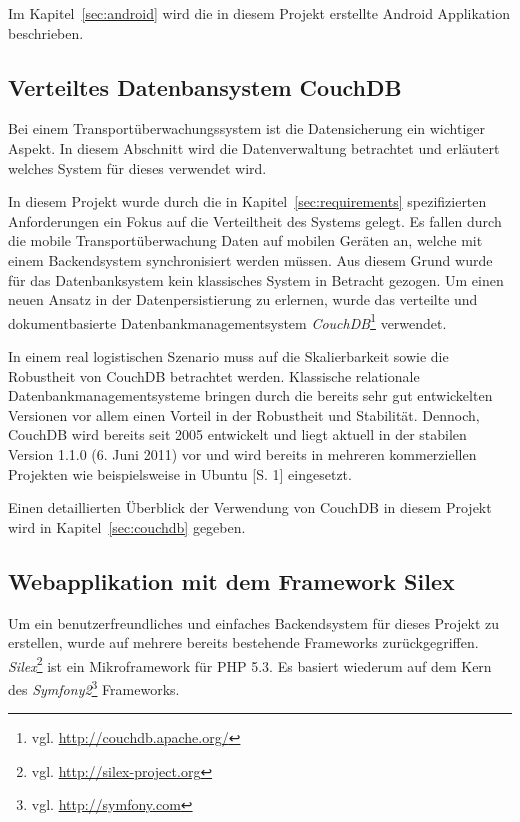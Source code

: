 Im Kapitel~\ref{sec:android} wird die in diesem Projekt erstellte Android Applikation
	beschrieben.

\subsection{Verteiltes Datenbansystem CouchDB}
\label{subsec:couchdb}

Bei einem Transportüberwachungssystem ist die Datensicherung ein
	wichtiger Aspekt. In diesem Abschnitt wird die Datenverwaltung
	betrachtet und erläutert welches System für dieses
	verwendet wird.

In diesem Projekt wurde durch die in Kapitel~\ref{sec:requirements} spezifizierten
	Anforderungen ein Fokus auf die Verteiltheit des Systems gelegt. Es fallen
	durch die mobile Transportüberwachung Daten auf mobilen Geräten an, welche
	mit einem Backendsystem synchronisiert werden müssen. Aus diesem Grund wurde
	für das Datenbanksystem kein klassisches System in Betracht gezogen. Um einen
	neuen Ansatz in der Datenpersistierung zu erlernen, wurde das verteilte
	und dokumentbasierte Datenbankmanagementsystem \emph{CouchDB}\footnote{vgl.
	\url{http://couchdb.apache.org/}} verwendet.

In einem real logistischen Szenario muss auf die Skalierbarkeit sowie die
	Robustheit von CouchDB betrachtet werden. Klassische relationale
	Datenbankmanagementsysteme bringen durch die bereits sehr gut entwickelten
	Versionen vor allem einen Vorteil in der Robustheit und Stabilität. Dennoch,
	CouchDB wird bereits seit 2005 entwickelt und liegt aktuell in der stabilen
	Version 1.1.0 (6. Juni 2011) vor und wird bereits in mehreren kommerziellen
	Projekten wie beispielsweise in Ubuntu \cite{Murphy09}[S. 1] eingesetzt.

Einen detaillierten Überblick der Verwendung von CouchDB in diesem Projekt
	wird in Kapitel~\ref{sec:couchdb} gegeben.

\subsection{Webapplikation mit dem Framework Silex}
\label{subsec:webapplication}

Um ein benutzerfreundliches und einfaches Backendsystem
	für dieses Projekt zu erstellen, wurde auf mehrere bereits bestehende Frameworks
	zurückgegriffen. \emph{Silex}\footnote{vgl. \url{http://silex-project.org}} ist
	ein	Mikroframework für PHP 5.3. Es basiert wiederum auf dem Kern des
	\emph{Symfony2}\footnote{vgl. \url{http://symfony.com}} Frameworks.
	
